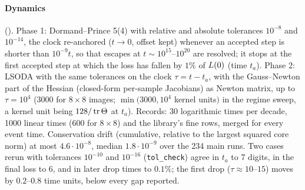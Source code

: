 \paragraph{Dynamics} ().
Phase 1: Dormand--Prince 5(4) with relative and absolute tolerances $10^{-8}$ and $10^{-14}$, the clock
re-anchored ($t\to0$, offset kept) whenever an accepted step is shorter than $10^{-9}t$, so that escapes at
$t\sim10^{15}$--$10^{20}$ are resolved; it stops at the first accepted step at which the loss has fallen
by $1\%$ of $L(0)$ (time $t_a$). Phase 2: LSODA with the same tolerances on the clock $\tau=t-t_a$, with the
Gauss--Newton part of the Hessian (closed-form per-sample Jacobians) as Newton matrix, up to
$\tau=10^4$ ($3000$ for $8\times8$ images; $\min(3000,10^4$ kernel units$)$ in the regime sweep, a kernel unit
being $128/\operatorname{tr}\Theta$ at $t_a$). Records: 30 logarithmic times per decade, 1000 linear times (600 for $8\times8$)
and the library's fine rows, merged for every event time. Conservation drift (cumulative, relative to
the largest squared core norm) at most $4.6\cdot10^{-8}$, median $1.8\cdot10^{-9}$ over the 234 main runs.
Two cases rerun with tolerances $10^{-10}$ and $10^{-16}$ (\texttt{tol\_check}) agree in $t_a$ to 7 digits, in
the final loss to 6, and in later drop times to $0.1\%$; the first drop ($\tau\approx10$--$15$) moves by
$0.2$--$0.8$ time units, below every gap reported.

